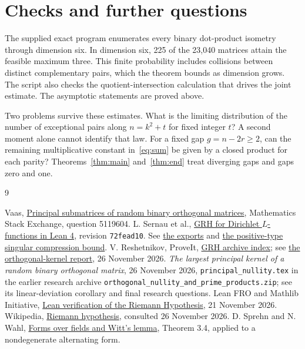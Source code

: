 \documentclass[11pt,letterpaper]{article}
\begin{document}
\section{Checks and further questions}
The supplied exact program enumerates every binary dot-product isometry through dimension six. In dimension six, 225 of the 23,040 matrices attain the feasible maximum three. This finite probability includes collisions between distinct complementary pairs, which the theorem bounds as dimension grows. The script also checks the quotient-intersection calculation that drives the joint estimate. The asymptotic statements are proved above.

Two problems survive these estimates. What is the limiting distribution of the number of exceptional pairs along $n=k^2+t$ for fixed integer $t$? A second moment alone cannot identify that law. For a fixed gap $g=n-2r\ge2$, can the remaining multiplicative constant in~\eqref{eq:sum} be given by a closed product for each parity? Theorems~\ref{thm:main} and~\ref{thm:end} treat diverging gaps and gaps zero and one.

\begin{thebibliography}{9}\small\raggedright\setlength{\itemsep}{1pt}\setlength{\parsep}{0pt}
 Vaas, \href{https://math.stackexchange.com/questions/5119604/principal-submatrices-of-random-binary-orthogonal-matrices}{Principal submatrices of random binary orthogonal matrices}, Mathematics Stack Exchange, question 5119604.
 L. Sernau et al., \href{https://github.com/lsernau/grh-lean/tree/72fead102f663d5c7a407964a13dc0cf9d977207}{GRH for Dirichlet $L$-functions in Lean 4}, revision \texttt{72fead10}. See \href{https://github.com/lsernau/grh-lean/blob/72fead102f663d5c7a407964a13dc0cf9d977207/grh/src/Main.lean}{the exports} and \href{https://github.com/lsernau/grh-lean/blob/72fead102f663d5c7a407964a13dc0cf9d977207/grh/src/New/Spanning/SecondMoment/PositiveType.lean}{the positive-type singular compression bound}.
 V. Reshetnikov, ProveIt, \href{https://github.com/VladimirReshetnikov/ProveIt/blob/4d7990202f9f106b2ffe8c209f073ad01d5e1987/Analysis/GeneralizedRiemannHypothesis/README.md}{GRH archive index}; see \href{https://github.com/VladimirReshetnikov/ProveIt/tree/4d7990202f9f106b2ffe8c209f073ad01d5e1987/Analysis/GeneralizedRiemannHypothesis/Research/grh_method_transfers_orthogonal_jets_2026-11-26}{the orthogonal-kernel report}, 26 November 2026.
 \emph{The largest principal kernel of a random binary orthogonal matrix}, 26 November 2026, \texttt{principal\_nullity.tex} in the earlier research archive \texttt{orthogonal\_nullity\_and\_prime\_products.zip}; see its linear-deviation corollary and final research questions.
 Lean FRO and Mathlib Initiative, \href{https://leanprover-community.github.io/blog/posts/riemann-hypothesis/}{Lean verification of the Riemann Hypothesis}, 21 November 2026.
 Wikipedia, \href{https://en.wikipedia.org/wiki/Riemann_hypothesis}{Riemann hypothesis}, consulted 26 November 2026.
 D. Sprehn and N. Wahl, \href{https://web.math.ku.dk/~wahl/Forms.pdf}{Forms over fields and Witt's lemma}, Theorem 3.4, applied to a nondegenerate alternating form.
\end{thebibliography}
\end{document}
